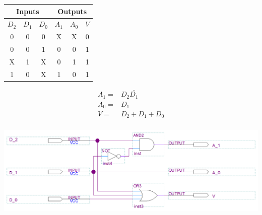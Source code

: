 \documentclass[12pt,letterpaper,titlepage]{report}
\begin{document}
\begin{raggedright}
\begin{paracol}{2}
\begin{center}
\begin{tabular}{|c|c|c||c|c|c|}\hline 
\multicolumn{3}{|c||}{Inputs}&\multicolumn{3}{|c|}{Outputs} \\\hline \hline
$D_2$ & $D_1$ & $D_0$ & $A_1$ & $A_0$ & $V$ \\\hline
0 & 0 & 0 & X & X & 0 \\ 
0 & 0 & 1 & 0 & 0 & 1 \\ 
X & 1 & X & 0 & 1 & 1 \\ 
1 & 0 & X & 1 & 0 & 1 \\\hline
\end{tabular} 
\end{center}
\switchcolumn
\begin{align*}
A_1 =& D_2\overline{D_1}\\
A_0 =& D_1\\
V   =& D_2+D_1+D_0\\
\end{align*}
\end{paracol}
\begin{center}
\includegraphics[width=\textwidth,height=0.9\textheight,keepaspectratio=true]{hw6p2}
\end{center}


\end{raggedright}
\end{document}

